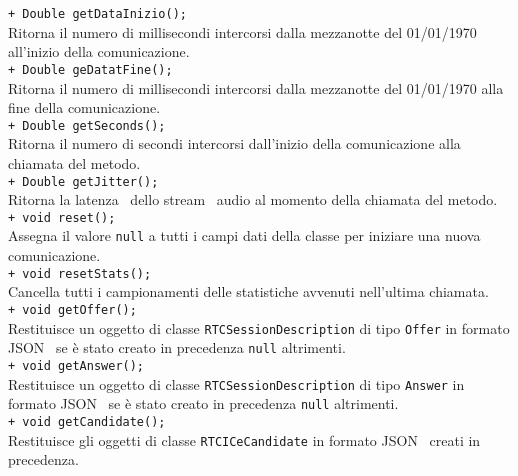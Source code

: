 {{\begin{sloppypar}
{{\begin{itemize}
{					\texttt{+ Double getDataInizio();}\\
					Ritorna il numero di millisecondi intercorsi dalla mezzanotte del 01/01/1970 all'inizio della comunicazione.\\

					\texttt{+ Double geDatatFine();}\\
					Ritorna il numero di millisecondi intercorsi dalla mezzanotte del 01/01/1970 alla fine della comunicazione.\\
					
					\texttt{+ Double getSeconds();}\\
					Ritorna il numero di secondi intercorsi dall'inizio della comunicazione alla chiamata del metodo.\\
					
					\texttt{+ Double getJitter();}\\
					Ritorna la latenza\g~ dello stream\g~ audio al momento della chiamata del metodo.\\
					
					\texttt{+ void reset();}\\
					Assegna il valore \texttt{null} a tutti i campi dati della classe per iniziare una nuova comunicazione.\\
					
					\texttt{+ void resetStats();}\\
					Cancella tutti i campionamenti delle statistiche avvenuti nell'ultima chiamata.\\
					
					\texttt{+ void getOffer();}\\
					Restituisce un oggetto di classe \texttt{RTCSessionDescription} di tipo \texttt{Offer} in formato JSON\g~ se è stato creato in precedenza \texttt{null} altrimenti.\\
					
					\texttt{+ void getAnswer();}\\
					Restituisce un oggetto di classe \texttt{RTCSessionDescription} di tipo \texttt{Answer} in formato JSON\g~ se è stato creato in precedenza \texttt{null} altrimenti.\\
					
					\texttt{+ void getCandidate();}\\
					Restituisce gli oggetti di classe \texttt{RTCICeCandidate} in formato JSON\g~ creati in precedenza.\\
				}
			\end{itemize}
			}
	}
	

\end{sloppypar}}}
